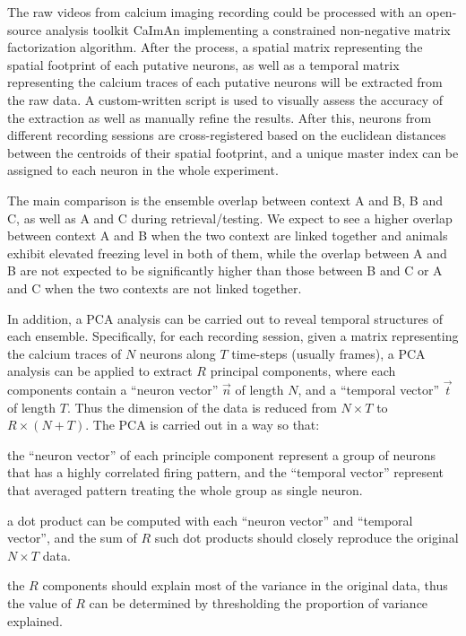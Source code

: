 \documentclass[master.tex]{subfiles}
\begin{document}
The raw videos from calcium imaging recording could be processed with an
open-source analysis toolkit CaImAn implementing a constrained non-negative
matrix factorization algorithm. After the process, a spatial matrix representing
the spatial footprint of each putative neurons, as well as a temporal matrix
representing the calcium traces of each putative neurons will be extracted from
the raw data. A custom-written script is used to visually assess the accuracy of
the extraction as well as manually refine the results. After this, neurons from
different recording sessions are cross-registered based on the euclidean
distances between the centroids of their spatial footprint, and a unique master
index can be assigned to each neuron in the whole experiment.

The main comparison is the ensemble overlap between context A and B, B and C, as
well as A and C during retrieval/testing. We expect to see a higher overlap
between context A and B when the two context are linked together and animals
exhibit elevated freezing level in both of them, while the overlap between A and
B are not expected to be significantly higher than those between B and C or A
and C when the two contexts are not linked together.

In addition, a PCA analysis can be carried out to reveal temporal structures of
each ensemble. Specifically, for each recording session, given a matrix
representing the calcium traces of $N$ neurons along $T$ time-steps (usually
frames), a PCA analysis can be applied to extract $R$ principal components,
where each components contain a ``neuron vector'' $\vec{n}$ of length $N$, and a
``temporal vector'' $\vec{t}$ of length $T$. Thus the dimension of the data is
reduced from $N \times T$ to $R \times (N + T)$. The PCA is carried out in a way
so that:
\begin{inparaenum}[a)]
\item the ``neuron vector'' of each principle component represent a group of
  neurons that has a highly correlated firing pattern, and the ``temporal
  vector'' represent that averaged pattern treating the whole group as single
  neuron.
\item a dot product can be computed with each ``neuron vector'' and ``temporal
  vector'', and the sum of $R$ such dot products should closely reproduce the
  original $N \times T$ data.
\item the $R$ components should explain most of the variance in the original
  data, thus the value of $R$ can be determined by thresholding the proportion
  of variance explained.
\end{inparaenum}
\end{document}
